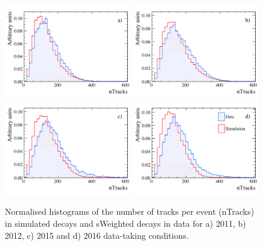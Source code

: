 \begin{figure}[tbp]
  \centering
    \includegraphics[width=0.49\textwidth]{./Figs/LifetimeMeasurement/Bd2KPi_2011_data_MC_nTracks.pdf}
    \includegraphics[width=0.49\textwidth]{./Figs/LifetimeMeasurement/Bd2KPi_2012_data_MC_nTracks.pdf}
    \includegraphics[width=0.49\textwidth]{./Figs/LifetimeMeasurement/Bd2KPi_2015_data_MC_nTracks.pdf}
    \includegraphics[width=0.49\textwidth]{./Figs/LifetimeMeasurement/Bd2KPi_2016_data_MC_nTracks.pdf}
  \caption{Normalised histograms of the number of tracks per event (nTracks) in simulated \bdkpi decays and sWeighted \bdkpi decays in data for a) 2011, b) 2012, c) 2015 and d) 2016 data-taking conditions.}  \label{fig:nTracksMCDataComp}
\end{figure}





